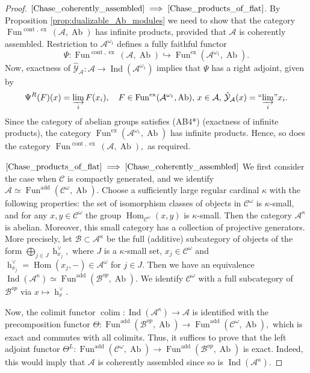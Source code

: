 \documentclass[11pt,leqno]{amsart}
\newcommand{\Implies}[2]{$\text{\ref{#1}}\implies\text{\ref{#2}}$}
\numberwithin{equation}{section}
\def\h{\operatorname{h}}
\def\Hom{\operatorname{Hom}}
\DeclareMathOperator*{\colim}{colim}
\newcommand{\indlim}[1][]{\mathop{\varinjlim}\limits_{#1}}
\newcommand{\inddlim}[1][]{{``{\indlim[#1]}"}}
\newcommand{\biggplus}[1][]{\mathop{\bigoplus}\limits_{#1}}
\newcommand{\hto}{\hookrightarrow}
\newcommand{\cont}{\operatorname{cont}}
\newcommand{\ex}{\operatorname{ex}}
\newcommand{\cA}{{\mathcal A}}
\newcommand{\cB}{{\mathcal B}}
\newcommand{\cC}{{\mathcal C}}
\newcommand{\cY}{{\mathcal Y}}
\newcommand{\Fun}{\operatorname{Fun}}
\newcommand{\Ab}{\operatorname{Ab}}
\newcommand{\add}{\operatorname{add}}
\newcommand{\Ind}{\operatorname{Ind}}
\begin{document}
\begin{proof} \Implies{Chase_coherently_assembled}{Chase_products_of_flat}. By Proposition \ref{prop:dualizable_Ab_modules} we need to show that the category $\Fun^{\cont,\ex}(\cA,\Ab)$ has infinite products, provided that $\cA$ is coherently assembled. Restriction to $\cA^{\omega_1}$ defines a fully faithful functor
\begin{equation*}
\Psi:\Fun^{\cont,\ex}(\cA,\Ab)\hto \Fun^{\ex}(\cA^{\omega_1},\Ab).
\end{equation*}
Now, exactness of $\hat{\cY}_{\cA}:\cA\to\Ind(\cA^{\omega_1})$ implies that $\Psi$ has a right adjoint, given by
\begin{equation*}
\Psi^R(F)(x)=\indlim[i]F(x_i),\quad F\in\Fun^{\ex}(\cA^{\omega_1},\Ab),\,x\in\cA,\,\hat{\cY}_{\cA}(x)=\inddlim[i]x_i.
\end{equation*}
Since the category of abelian groups satisfies (AB4*) (exactness of infinite products), the category $\Fun^{\ex}(\cA^{\omega_1},\Ab)$ has infinite products. Hence, so does the category $\Fun^{\cont,\ex}(\cA,\Ab),$ as required.

\Implies{Chase_products_of_flat}{Chase_coherently_assembled} We first consider the case when $\cC$ is compactly generated, and we identify $\cA\simeq\Fun^{\add}(\cC^{\omega},\Ab).$ Choose a sufficiently large regular cardinal $\kappa$ with the following properties: the set of isomorphism classes of objects in $\cC^{\omega}$ is $\kappa$-small, and for any $x,y\in\cC^{\omega}$ the group $\Hom_{\cC^{\omega}}(x,y)$ is $\kappa$-small. Then the category $\cA^{\kappa}$ is abelian. Moreover, this small category has a collection of projective generators. More precisely, let $\cB\subset\cA^{\kappa}$ be the full (additive) subcategory of objects of the form $\biggplus[j\in J]\h_{x_j}^{\vee},$ where $J$ is a $\kappa$-small set, $x_j\in\cC^{\omega}$ and $\h_{x_j}^{\vee}=\Hom(x_j,-)\in\cA^{\omega}$ for $j\in J.$ Then we have an equivalence $\Ind(\cA^{\kappa})\simeq\Fun^{\add}(\cB^{op},\Ab).$ We identify $\cC^{\omega}$ with a full subcategory of $\cB^{op}$ via $x\mapsto \h_x^{\vee}.$

Now, the colimit functor $\colim:\Ind(\cA^{\kappa})\to\cA$ is identified with the precomposition functor $\Theta:\Fun^{\add}(\cB^{op},\Ab)\to\Fun^{\add}(\cC^{\omega},\Ab),$ which is exact and commutes with all colimits. Thus, it suffices to prove that the left adjoint functor $\Theta^L:\Fun^{\add}(\cC^{\omega},\Ab)\to\Fun^{\add}(\cB^{op},\Ab)$ is exact. Indeed, this would imply that $\cA$ is coherently assembled since so is $\Ind(\cA^{\kappa}).$


\end{proof}
\end{document}
